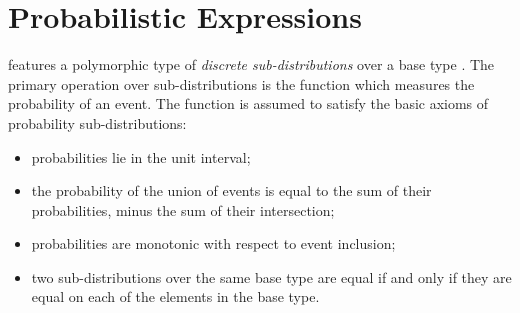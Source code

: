 %
%
%
%
%
%
%

\section{Probabilistic Expressions\label{sec:distributions}}

\EasyCrypt features a polymorphic type  of \emph{discrete
sub-distributions} over a base type . The primary operation over
sub-distributions is the function  which measures the probability of an event. The function is assumed to
satisfy the basic axioms of probability sub-distributions:
\begin{itemize}\itemsep-.5em
\item probabilities lie in the unit interval;
\item the probability of the union of events is equal to the sum of
  their probabilities, minus the sum of their intersection;
\item probabilities are monotonic with respect to event inclusion;
\item two sub-distributions over the same base type are equal if and only if
  they are equal on each of the elements in the base type.
\end{itemize}

